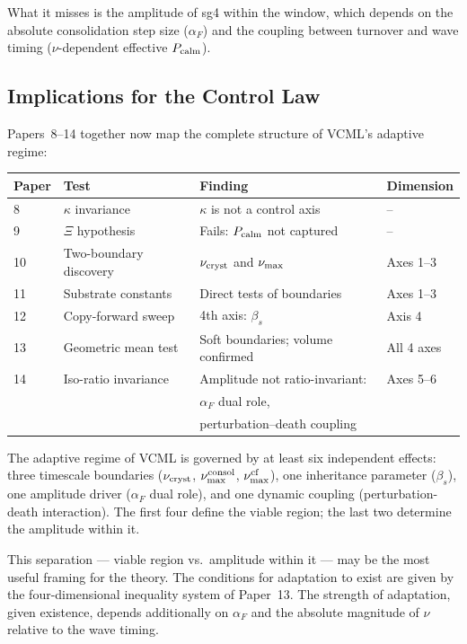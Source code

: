\documentclass[11pt]{article}
\begin{document}
What it misses is the amplitude of sg4 within the window, which depends
on the absolute consolidation step size ($\alpha_F$) and the coupling between
turnover and wave timing ($\nu$-dependent effective $P_{\rm calm}$).

\subsection{Implications for the Control Law}

Papers~8--14 together now map the complete structure of VCML's adaptive regime:

\begin{center}
\begin{tabular}{llll}
\toprule
Paper & Test & Finding & Dimension \\
\midrule
8  & $\kappa$ invariance & $\kappa$ is not a control axis & -- \\
9  & $\Xi$ hypothesis & Fails: $P_{\rm calm}$ not captured & -- \\
10 & Two-boundary discovery & $\nu_{\rm cryst}$ and $\nu_{\rm max}$ & Axes 1--3 \\
11 & Substrate constants & Direct tests of boundaries & Axes 1--3 \\
12 & Copy-forward sweep & 4th axis: $\beta_s$ & Axis 4 \\
13 & Geometric mean test & Soft boundaries; volume confirmed & All 4 axes \\
14 & Iso-ratio invariance & Amplitude not ratio-invariant: & Axes 5--6 \\
   &                      & $\alpha_F$ dual role, & \\
   &                      & perturbation--death coupling & \\
\bottomrule
\end{tabular}
\end{center}

The adaptive regime of VCML is governed by at least six independent effects:
three timescale boundaries ($\nu_{\rm cryst}$, $\nu_{\rm max}^{\rm consol}$,
$\nu_{\rm max}^{\rm cf}$), one inheritance parameter ($\beta_s$), one
amplitude driver ($\alpha_F$ dual role), and one dynamic coupling (perturbation-
death interaction). The first four define the viable region; the last two
determine the amplitude within it.

This separation --- viable region vs.\ amplitude within it --- may be the
most useful framing for the theory. The conditions for adaptation to exist are
given by the four-dimensional inequality system of Paper~13. The strength of
adaptation, given existence, depends additionally on $\alpha_F$ and the
absolute magnitude of $\nu$ relative to the wave timing.
\end{document}
